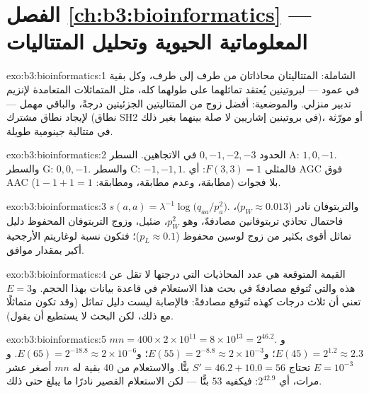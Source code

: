 \section*{الفصل \ref{ch:b3:bioinformatics} --- المعلوماتية الحيوية وتحليل المتتاليات}

\begin{solution}{exo:b3:bioinformatics:1}
الشاملة: المتتاليتان محاذاتان من طرف إلى طرف، وكل بقية في عمود
--- لبروتينين يُعتقد تماثلهما على طولهما كله، مثل
المتماثلات المتعامدة لإنزيم تدبير منزلي. والموضعية: أفضل زوج من
المتتاليتين الجزئيتين درجةً، والباقي مهمل --- لإيجاد نطاق مشترك (نطاق SH2
في بروتينين إشاريين لا صلة بينهما بغير ذلك)، أو مورّثة في
متتالية جينومية طويلة.
\end{solution}

\begin{solution}{exo:b3:bioinformatics:2}
الحدود $0,-1,-2,-3$ في الاتجاهين. السطر A: $1, 0, -1$. والسطر G: $0, 0, -1$.
والسطر C: $-1, -1, 1$. فالمثلى $F(3,3) = 1$: أي AGC فوق AAC بلا فجوات
(مطابقة، وعدم مطابقة، ومطابقة: $1 - 1 + 1 = 1$).
\end{solution}

\begin{solution}{exo:b3:bioinformatics:3}
$s(a,a) = \lambda^{-1}\log\bigl(q_{aa}/p_{a}^{2}\bigr)$. والتربتوفان
نادر ($p_{W} \approx 0.013$)، فاحتمال تحاذي تربتوفانين
مصادفةً، وهو $p_{W}^{2}$، ضئيل، وزوج التربتوفان المحفوظ دليل
تماثل أقوى بكثير من زوج لوسين محفوظ ($p_{L}
\approx 0.1$)؛ فتكون نسبة لوغاريتم الأرجحية أكبر بمقدار موافق.
\end{solution}

\begin{solution}{exo:b3:bioinformatics:4}
القيمة المتوقعة هي عدد المحاذيات التي درجتها لا تقل عن هذه
والتي تُتوقع مصادفةً في بحث هذا الاستعلام في
قاعدة بيانات بهذا الحجم. و$E = 3$ تعني أن ثلاث درجات كهذه تُتوقع
مصادفةً: فالإصابة ليست دليل تماثل (وقد تكون متماثلًا مع ذلك، لكن
البحث لا يستطيع أن يقول).
\end{solution}

\begin{solution}{exo:b3:bioinformatics:5}
$mn = 400\times 2\times 10^{11} = 8\times 10^{13} = 2^{46.2}$. و$E(45) =
2^{1.2} \approx 2.3$؛ و$E(55) = 2^{-8.8} \approx 2\times 10^{-3}$؛
و$E(65) = 2^{-18.8} \approx 2\times 10^{-6}$. و$E = 10^{-3}$ تحتاج $S' =
46.2 + 10.0 = 56$ بتًّا. والاستعلام من \num{40} بقية له $mn$ أصغر عشر
مرات، أي $2^{42.9}$: فيكفيه $53$ بتًّا --- لكن الاستعلام القصير نادرًا
ما يبلغ حتى ذلك.
\end{solution}

